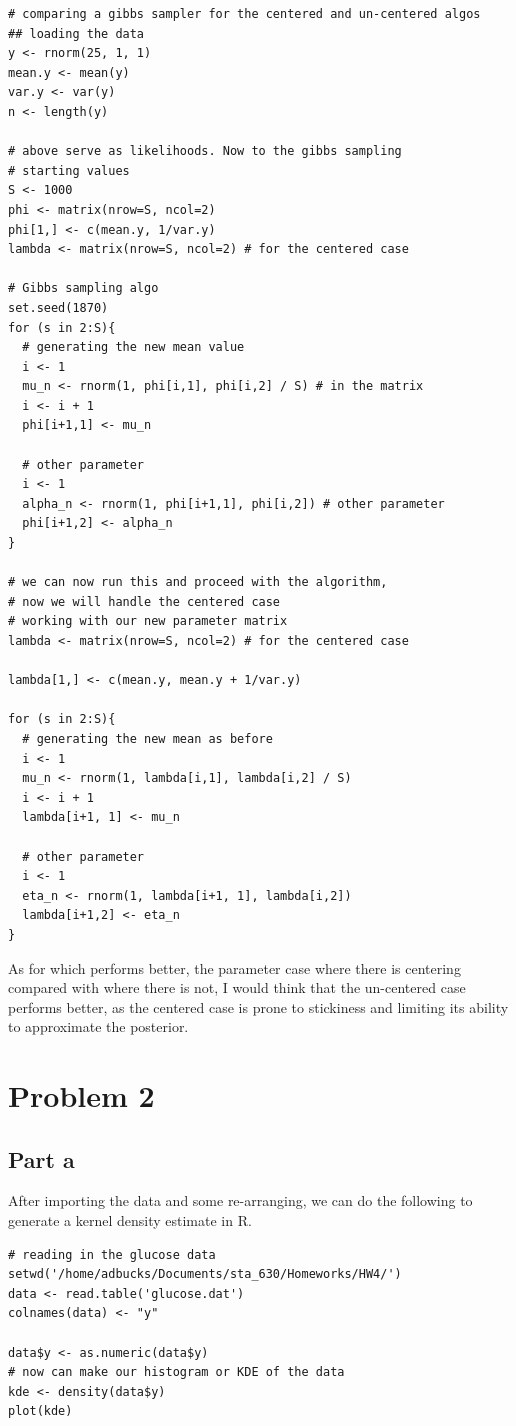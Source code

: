 \documentclass[12pt, letterpaper]{article}
\begin{document}
\begin{verbatim}
# comparing a gibbs sampler for the centered and un-centered algos 
## loading the data 
y <- rnorm(25, 1, 1)
mean.y <- mean(y)
var.y <- var(y)
n <- length(y)

# above serve as likelihoods. Now to the gibbs sampling 
# starting values 
S <- 1000
phi <- matrix(nrow=S, ncol=2)
phi[1,] <- c(mean.y, 1/var.y)
lambda <- matrix(nrow=S, ncol=2) # for the centered case 

# Gibbs sampling algo 
set.seed(1870)
for (s in 2:S){
  # generating the new mean value 
  i <- 1
  mu_n <- rnorm(1, phi[i,1], phi[i,2] / S) # in the matrix 
  i <- i + 1
  phi[i+1,1] <- mu_n 
  
  # other parameter 
  i <- 1
  alpha_n <- rnorm(1, phi[i+1,1], phi[i,2]) # other parameter 
  phi[i+1,2] <- alpha_n
}

# we can now run this and proceed with the algorithm, 
# now we will handle the centered case 
# working with our new parameter matrix 
lambda <- matrix(nrow=S, ncol=2) # for the centered case 

lambda[1,] <- c(mean.y, mean.y + 1/var.y)

for (s in 2:S){
  # generating the new mean as before 
  i <- 1
  mu_n <- rnorm(1, lambda[i,1], lambda[i,2] / S)
  i <- i + 1
  lambda[i+1, 1] <- mu_n
  
  # other parameter 
  i <- 1
  eta_n <- rnorm(1, lambda[i+1, 1], lambda[i,2])
  lambda[i+1,2] <- eta_n 
}
\end{verbatim}

As for which performs better, the parameter case where there is centering compared with where there is not, I would think that the un-centered case performs better, as the centered case is prone to stickiness and limiting its ability to approximate the posterior. 

\section{Problem 2} 

\subsection{Part a} 

After importing the data and some re-arranging, we can do the following to generate a kernel density estimate in R. 

\begin{verbatim}
# reading in the glucose data 
setwd('/home/adbucks/Documents/sta_630/Homeworks/HW4/')
data <- read.table('glucose.dat')
colnames(data) <- "y"

data$y <- as.numeric(data$y)
# now can make our histogram or KDE of the data 
kde <- density(data$y)
plot(kde)
\end{verbatim}
\end{document}
